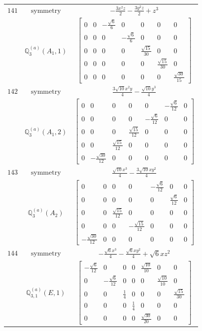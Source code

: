 \documentclass[fleqn,8pt,landscape]{jsarticle}
\begin{document}
\begin{longtable}{ccc}
$ 141 $ & $ \text{symmetry} $ & $ - \frac{3 x^{2} z}{2} - \frac{3 y^{2} z}{2} + z^{3} $ \\
$  $ & $ \mathbb{Q}_{3}^{(a)}(A_{1},1) $ & $ \begin{bmatrix} 0 & 0 & - \frac{\sqrt{6}}{6} & 0 & 0 & 0 & 0 \\ 0 & 0 & 0 & - \frac{\sqrt{6}}{6} & 0 & 0 & 0 \\ 0 & 0 & 0 & 0 & \frac{\sqrt{15}}{30} & 0 & 0 \\ 0 & 0 & 0 & 0 & 0 & \frac{\sqrt{15}}{30} & 0 \\ 0 & 0 & 0 & 0 & 0 & 0 & \frac{\sqrt{30}}{15} \end{bmatrix} $ \\ \hline
$ 142 $ & $ \text{symmetry} $ & $ \frac{3 \sqrt{10} x^{2} y}{4} - \frac{\sqrt{10} y^{3}}{4} $ \\
$  $ & $ \mathbb{Q}_{3}^{(a)}(A_{1},2) $ & $ \begin{bmatrix} 0 & 0 & 0 & 0 & 0 & - \frac{\sqrt{6}}{12} & 0 \\ 0 & 0 & 0 & 0 & - \frac{\sqrt{6}}{12} & 0 & 0 \\ 0 & 0 & 0 & \frac{\sqrt{15}}{12} & 0 & 0 & 0 \\ 0 & 0 & \frac{\sqrt{15}}{12} & 0 & 0 & 0 & 0 \\ 0 & - \frac{\sqrt{30}}{12} & 0 & 0 & 0 & 0 & 0 \end{bmatrix} $ \\ \hline
$ 143 $ & $ \text{symmetry} $ & $ \frac{\sqrt{10} x^{3}}{4} - \frac{3 \sqrt{10} x y^{2}}{4} $ \\
$  $ & $ \mathbb{Q}_{3}^{(a)}(A_{2}) $ & $ \begin{bmatrix} 0 & 0 & 0 & 0 & - \frac{\sqrt{6}}{12} & 0 & 0 \\ 0 & 0 & 0 & 0 & 0 & \frac{\sqrt{6}}{12} & 0 \\ 0 & 0 & \frac{\sqrt{15}}{12} & 0 & 0 & 0 & 0 \\ 0 & 0 & 0 & - \frac{\sqrt{15}}{12} & 0 & 0 & 0 \\ - \frac{\sqrt{30}}{12} & 0 & 0 & 0 & 0 & 0 & 0 \end{bmatrix} $ \\ \hline
$ 144 $ & $ \text{symmetry} $ & $ - \frac{\sqrt{6} x^{3}}{4} - \frac{\sqrt{6} x y^{2}}{4} + \sqrt{6} x z^{2} $ \\
$  $ & $ \mathbb{Q}_{3,1}^{(a)}(E,1) $ & $ \begin{bmatrix} - \frac{\sqrt{6}}{12} & 0 & 0 & 0 & \frac{\sqrt{10}}{10} & 0 & 0 \\ 0 & - \frac{\sqrt{6}}{12} & 0 & 0 & 0 & \frac{\sqrt{10}}{10} & 0 \\ 0 & 0 & \frac{1}{4} & 0 & 0 & 0 & \frac{\sqrt{15}}{30} \\ 0 & 0 & 0 & \frac{1}{4} & 0 & 0 & 0 \\ 0 & 0 & 0 & 0 & \frac{\sqrt{30}}{20} & 0 & 0 \end{bmatrix} $ \\ \hline

\end{longtable}
\end{document}
